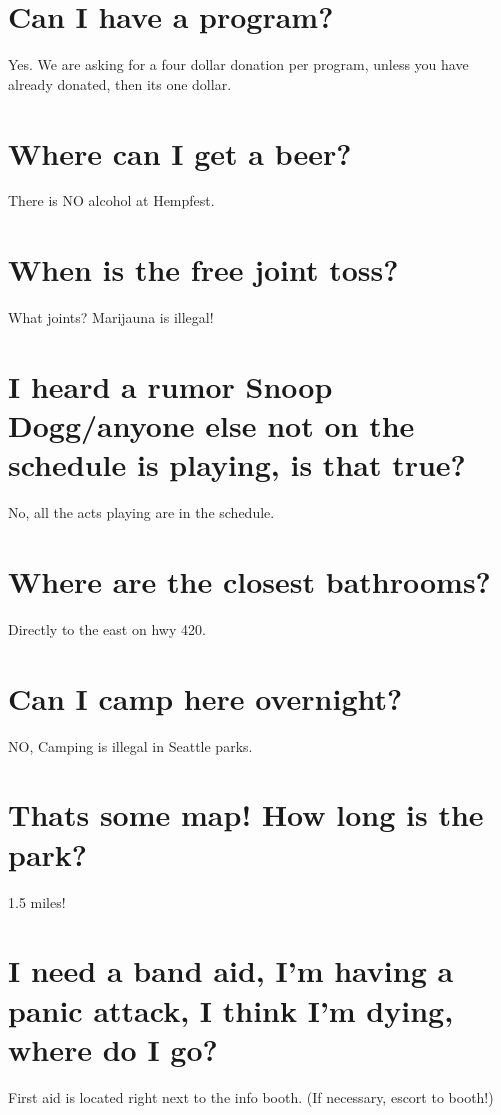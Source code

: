 \section{Can I have a program?}
Yes. We are asking for a four dollar donation per program, unless you have already donated, then its one dollar. 

\section{Where can I get a beer?}
There is NO alcohol at Hempfest. 

\section{When is the free joint toss?}
What joints? Marijauna is illegal! 

\section{I heard a rumor Snoop Dogg/anyone else not on the schedule is playing, is that true?}
No, all the acts playing are in the schedule.

\section{Where are the closest bathrooms?}
Directly to the east on hwy 420.

 
\section{Can I camp here overnight?}
NO, Camping is illegal in Seattle parks.

\section{Thats some map! How long is the park?}
1.5 miles! 

\section{I need a band aid, I'm having a panic attack, I think I'm dying, where do I go?}
First aid is located right next to the info booth. (If necessary, escort to booth!)








